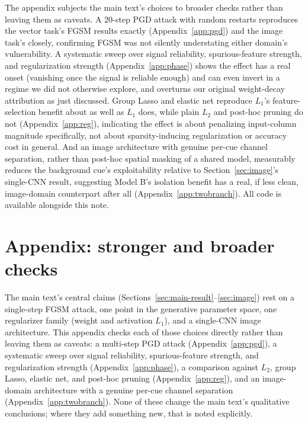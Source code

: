 \documentclass[11pt]{article}
\begin{document}
The appendix subjects the main text's choices to broader checks rather
than leaving them as caveats. A 20-step PGD attack with random restarts
reproduces the vector task's FGSM results exactly (Appendix~\ref{app:pgd})
and the image task's closely, confirming FGSM was not silently
understating either domain's vulnerability. A systematic sweep over
signal reliability, spurious-feature strength, and regularization
strength (Appendix~\ref{app:phase}) shows the effect has a real onset
(vanishing once the signal is reliable enough) and can even invert in a
regime we did not otherwise explore, and overturns our original
weight-decay attribution as just discussed. Group Lasso and elastic net
reproduce $L_1$'s feature-selection benefit about as well as $L_1$ does,
while plain $L_2$ and post-hoc pruning do not
(Appendix~\ref{app:reg}), indicating the effect is about penalizing
input-column magnitude specifically, not about sparsity-inducing
regularization or accuracy cost in general. And an image architecture
with genuine per-cue channel separation, rather than post-hoc spatial
masking of a shared model, measurably reduces the background cue's
exploitability relative to Section~\ref{sec:image}'s single-CNN result,
suggesting Model B's isolation benefit has a real, if less clean, image-domain
counterpart after all (Appendix~\ref{app:twobranch}). All code is
available alongside this note.

\appendix

\section{Appendix: stronger and broader checks}

The main text's central claims (Sections~\ref{sec:main-result}--\ref{sec:image})
rest on a single-step FGSM attack, one point in the generative parameter
space, one regularizer family (weight and activation $L_1$), and a
single-CNN image architecture. This appendix checks each of those choices
directly rather than leaving them as caveats: a multi-step PGD attack
(Appendix~\ref{app:pgd}), a systematic sweep over signal reliability,
spurious-feature strength, and regularization strength
(Appendix~\ref{app:phase}), a comparison against $L_2$, group Lasso,
elastic net, and post-hoc pruning (Appendix~\ref{app:reg}), and an
image-domain architecture with a genuine per-cue channel separation
(Appendix~\ref{app:twobranch}). None of these change the main text's
qualitative conclusions; where they add something new, that is noted
explicitly.
\end{document}
